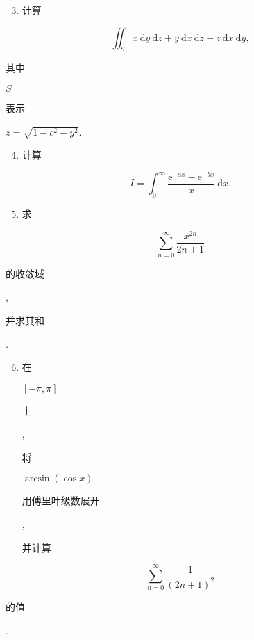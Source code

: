 \documentclass[10pt]{article}
\begin{document}
\begin{enumerate}
  \setcounter{enumi}{2}
  \item \begin{CJK}{UTF8}{mj}计算\end{CJK}
\end{enumerate}
$$
\iint_{S} x \mathrm{~d} y \mathrm{~d} z+y \mathrm{~d} x \mathrm{~d} z+z \mathrm{~d} x \mathrm{~d} y,
$$
\begin{CJK}{UTF8}{mj}其中\end{CJK} $S$ \begin{CJK}{UTF8}{mj}表示\end{CJK} $z=\sqrt{1-c^{2}-y^{2}}$.

\begin{enumerate}
  \setcounter{enumi}{3}
  \item \begin{CJK}{UTF8}{mj}计算\end{CJK}
\end{enumerate}
$$
I=\int_{0}^{\infty} \frac{\mathrm{e}^{-a x}-\mathrm{e}^{-b x}}{x} \mathrm{~d} x .
$$

\begin{enumerate}
  \setcounter{enumi}{4}
  \item \begin{CJK}{UTF8}{mj}求\end{CJK}
\end{enumerate}
$$
\sum_{n=0}^{\infty} \frac{x^{2 n}}{2 n+1}
$$
\begin{CJK}{UTF8}{mj}的收敛域\end{CJK}, \begin{CJK}{UTF8}{mj}并求其和\end{CJK}.

\begin{enumerate}
  \setcounter{enumi}{5}
  \item \begin{CJK}{UTF8}{mj}在\end{CJK} $[-\pi, \pi]$ \begin{CJK}{UTF8}{mj}上\end{CJK}, \begin{CJK}{UTF8}{mj}将\end{CJK} $\arcsin (\cos x)$ \begin{CJK}{UTF8}{mj}用傅里叶级数展开\end{CJK}, \begin{CJK}{UTF8}{mj}并计算\end{CJK}
\end{enumerate}
$$
\sum_{n=0}^{\infty} \frac{1}{(2 n+1)^{2}}
$$
\begin{CJK}{UTF8}{mj}的值\end{CJK}.
\end{document}

